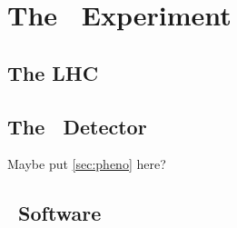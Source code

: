 \chapter{The \atlas\ Experiment}
\section{The LHC}
\section{The \atlas\ Detector}
Maybe put \cref{sec:pheno} here?
\section{\atlas\ Software}

